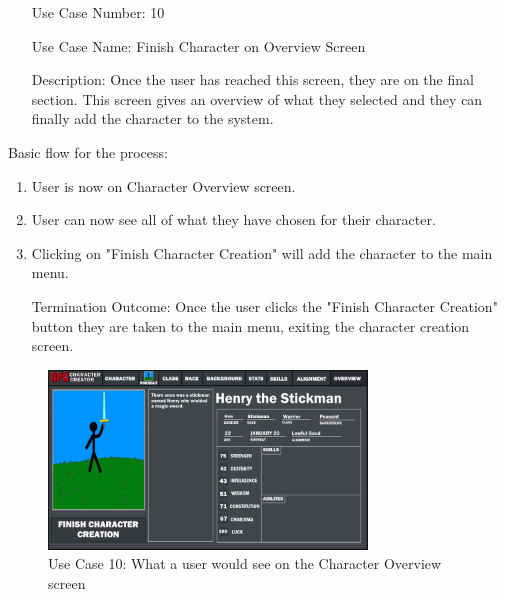 \documentclass[10pt,conference,onecolumn,compsoc]{IEEEtran}
\begin{document}
\begin{itemize}
\item[Use Case Number:] 10
\item[Use Case Name:] Finish Character on Overview Screen
\item[Description:] Once the user has reached this screen, they are on the final section. This screen gives an overview of what they selected and they can finally add the character to the system.
\end{itemize}
Basic flow for the process:
\begin{enumerate}
\item User is now on Character Overview screen.
\item User can now see all of what they have chosen for their character.
\item Clicking on "Finish Character Creation" will add the character to the main menu.
\item[Termination Outcome:] Once the user clicks the "Finish Character Creation" button they are taken to the main menu, exiting the character creation screen.
\end{enumerate}

\begin{figure}[H]
\includegraphics[height=180px, width=320px]{CSCI 352 Interface Mockups/Interface Mockup 5.png}
\caption{Use Case 10: What a user would see on the Character Overview screen}
\centering
\label{mockup5}
\end{figure}
\end{document}

